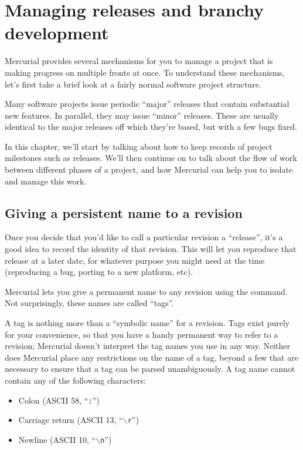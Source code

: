 \chapter{Managing releases and branchy development}
\label{chap:branch}

Mercurial provides several mechanisms for you to manage a project that
is making progress on multiple fronts at once.  To understand these
mechanisms, let's first take a brief look at a fairly normal software
project structure.

Many software projects issue periodic ``major'' releases that contain
substantial new features.  In parallel, they may issue ``minor''
releases.  These are usually identical to the major releases off which
they're based, but with a few bugs fixed.

In this chapter, we'll start by talking about how to keep records of
project milestones such as releases.  We'll then continue on to talk
about the flow of work between different phases of a project, and how
Mercurial can help you to isolate and manage this work.

\section{Giving a persistent name to a revision}

Once you decide that you'd like to call a particular revision a
``release'', it's a good idea to record the identity of that revision.
This will let you reproduce that release at a later date, for whatever
purpose you might need at the time (reproducing a bug, porting to a
new platform, etc).

Mercurial lets you give a permanent name to any revision using the
 command.  Not surprisingly, these names are called
``tags''.

A tag is nothing more than a ``symbolic name'' for a revision.  Tags
exist purely for your convenience, so that you have a handy permanent
way to refer to a revision; Mercurial doesn't interpret the tag names
you use in any way.  Neither does Mercurial place any restrictions on
the name of a tag, beyond a few that are necessary to ensure that a
tag can be parsed unambiguously.  A tag name cannot contain any of the
following characters:
\begin{itemize}
\item Colon (ASCII 58, ``\texttt{:}'')
\item Carriage return (ASCII 13, ``\texttt{$\backslash$r}'')
\item Newline (ASCII 10, ``\texttt{$\backslash$n}'')
\end{itemize}


